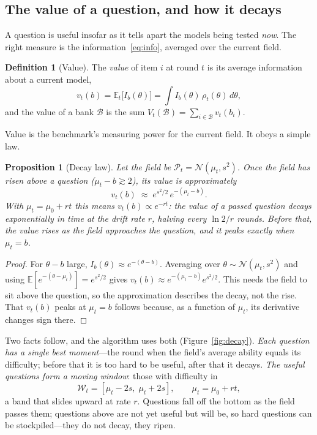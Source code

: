\documentclass[11pt]{article}
\newcommand{\E}{\mathbb{E}}
\newcommand{\cB}{\mathcal{B}}
\newcommand{\cW}{\mathcal{W}}
\newcommand{\cP}{\mathcal{P}}
\newcommand{\cN}{\mathcal{N}}
\theoremstyle{plain}
\newtheorem{proposition}{Proposition}
\theoremstyle{definition}
\newtheorem{definition}{Definition}
\theoremstyle{remark}
\begin{document}
\subsection{The value of a question, and how it decays}
\label{sec:value}

A question is useful insofar as it tells apart the models being tested \emph{now}.
The right measure is the information~\eqref{eq:info}, averaged over the current
field.

\begin{definition}[Value]
\label{def:value}
The \emph{value} of item $i$ at round $t$ is its average information about a current
model,
\begin{equation}
v_t(b)=\E_t\bigl[I_b(\theta)\bigr]=\int I_b(\theta)\,\rho_t(\theta)\,d\theta,
\label{eq:value}
\end{equation}
and the value of a bank $\cB$ is the sum $V_t(\cB)=\sum_{i\in\cB}v_t(b_i)$.
\end{definition}

Value is the benchmark's measuring power for the current field. It obeys a simple law.

\begin{proposition}[Decay law]
\label{prop:decay}
Let the field be $\cP_t=\cN(\mu_t,s^2)$. Once the field has risen above a question
($\mu_t-b\gtrsim 2$), its value is approximately
\begin{equation}
v_t(b)\;\approx\;e^{s^2/2}\,e^{-(\mu_t-b)}.
\label{eq:decay}
\end{equation}
With $\mu_t=\mu_0+rt$ this means $v_t(b)\propto e^{-rt}$: the value of a passed
question decays exponentially in time at the drift rate $r$, halving every
$\ln 2/r$ rounds. Before that, the value \emph{rises} as the field approaches the
question, and it peaks exactly when $\mu_t=b$.
\end{proposition}

\begin{proof}
For $\theta-b$ large, $I_b(\theta)\approx e^{-(\theta-b)}$. Averaging over
$\theta\sim\cN(\mu_t,s^2)$ and using $\E[e^{-(\theta-\mu_t)}]=e^{s^2/2}$ gives
$v_t(b)\approx e^{-(\mu_t-b)}e^{s^2/2}$. This needs the field to sit above the
question, so the approximation describes the decay, not the rise. That $v_t(b)$ peaks
at $\mu_t=b$ follows because, as a function of $\mu_t$, its derivative changes sign
there.
\end{proof}

Two facts follow, and the algorithm uses both (Figure~\ref{fig:decay}). \emph{Each
question has a single best moment}---the round when the field's average ability
equals its difficulty; before that it is too hard to be useful, after that it decays.
\emph{The useful questions form a moving window}: those with difficulty in
\begin{equation}
\cW_t=[\mu_t-2s,\;\mu_t+2s],\qquad \mu_t=\mu_0+rt,
\label{eq:window}
\end{equation}
a band that slides upward at rate $r$. Questions fall off the bottom as the field
passes them; questions above are not yet useful but will be, so hard questions can be
stockpiled---they do not decay, they ripen.
\end{document}
